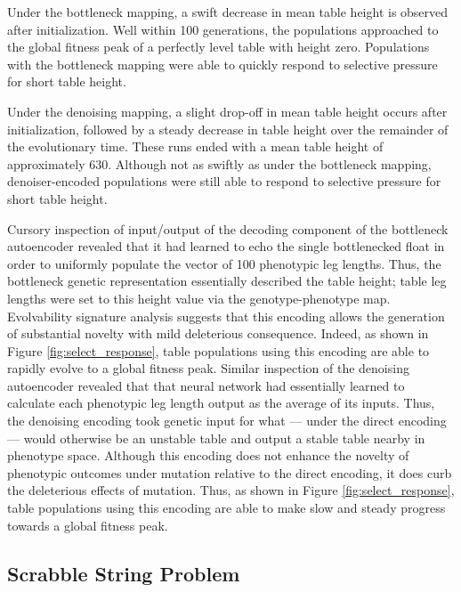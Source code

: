 Under the bottleneck mapping, a swift decrease in mean table height is observed after initialization.
Well within 100 generations, the populations approached to the global fitness peak of a perfectly level table with height zero.
Populations with the bottleneck mapping were able to quickly respond to selective pressure for short table height.

Under the denoising mapping, a slight drop-off in mean table height occurs after initialization, followed by a steady decrease in table height over the remainder of the evolutionary time.
These runs ended with a mean table height of approximately 630.
Although not as swiftly as under the bottleneck mapping, denoiser-encoded populations were still able to respond to selective pressure for short table height.



Cursory inspection of input/output of the decoding component of the bottleneck autoencoder revealed that it had learned to echo the single bottlenecked float in order to uniformly populate the vector of 100 phenotypic leg lengths.
Thus, the bottleneck genetic representation essentially described the table height; table leg lengths were set to this height value via the genotype-phenotype map.
Evolvability signature analysis suggests that this encoding allows the generation of substantial novelty with mild deleterious consequence.
Indeed, as shown in Figure \ref{fig:select_response}, table populations using this encoding are able to rapidly evolve to a global fitness peak.
Similar inspection of the denoising autoencoder revealed that that neural network had essentially learned to calculate each phenotypic leg length output as the average of its inputs.
Thus, the denoising encoding took genetic input for what --- under the direct encoding --- would otherwise be an unstable table and output a stable table nearby in phenotype space.
Although this encoding does not enhance the novelty of phenotypic outcomes under mutation relative to the direct encoding, it does curb the deleterious effects of mutation.
Thus, as shown in Figure \ref{fig:select_response}, table populations using this encoding are able to make slow and steady progress towards a global fitness peak.

\subsection{Scrabble String Problem}






